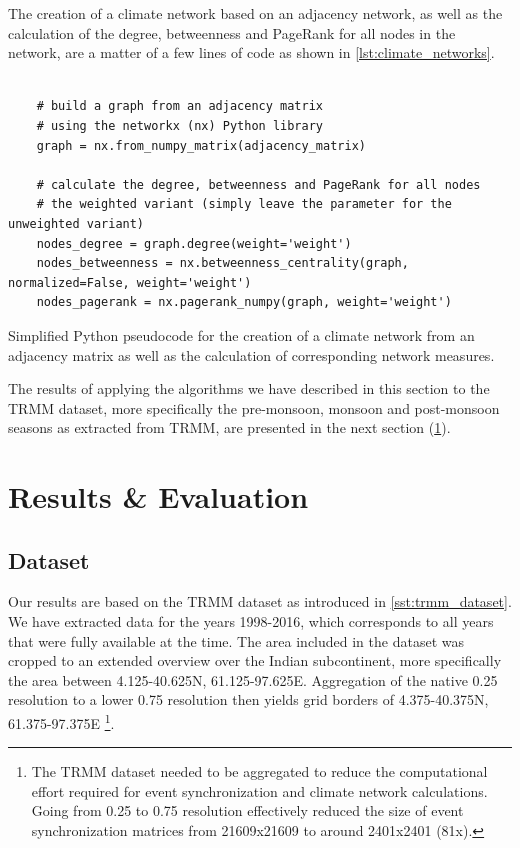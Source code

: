 The creation of a climate network based on an adjacency network, as well as the calculation of the degree, betweenness and PageRank for all nodes in the network, are a matter of a few lines of code as shown in \cref{lst:climate_networks}.

\begin{listing}[H]
  \begin{verbatim}

    # build a graph from an adjacency matrix
    # using the networkx (nx) Python library
    graph = nx.from_numpy_matrix(adjacency_matrix)

    # calculate the degree, betweenness and PageRank for all nodes
    # the weighted variant (simply leave the parameter for the unweighted variant)
    nodes_degree = graph.degree(weight='weight')
    nodes_betweenness = nx.betweenness_centrality(graph, normalized=False, weight='weight')
    nodes_pagerank = nx.pagerank_numpy(graph, weight='weight')

  \end{verbatim}
  \caption{Simplified Python pseudocode for the creation of a climate network from an adjacency matrix as well as the calculation of corresponding network measures.}
  \label{lst:climate_networks}
\end{listing}

The results of applying the algorithms we have described in this section to the TRMM dataset, more specifically the pre-monsoon, monsoon and post-monsoon seasons as extracted from TRMM, are presented in the next section (\cref{st:event_sync_results}).

\section{Results \& Evaluation}
\label{st:event_sync_results}


\subsection{Dataset}
Our results are based on the TRMM dataset as introduced in \cref{sst:trmm_dataset}. We have extracted data for the years 1998-2016, which corresponds to all years that were fully available at the time. The area included in the dataset was cropped to an extended overview over the Indian subcontinent, more specifically the area between 4.125-40.625N, 61.125-97.625E. Aggregation of the native {0.25\degree} resolution to a lower {0.75\degree} resolution then yields grid borders of 4.375-40.375N, 61.375-97.375E \footnote{The TRMM dataset needed to be aggregated to reduce the computational effort required for event synchronization and climate network calculations. Going from {0.25\degree} to {0.75\degree} resolution effectively reduced the size of event synchronization matrices from 21609x21609 to around 2401x2401 (81x).}.

